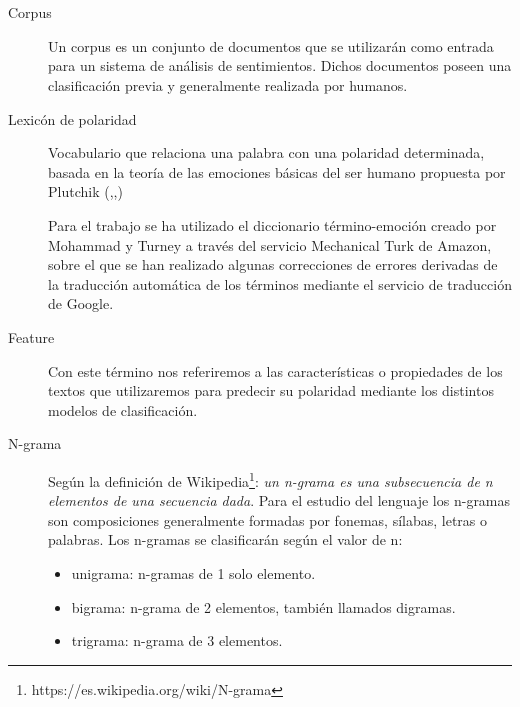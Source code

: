 \chapter*{\nomeglosariotermos}
\label{chap:glosario-termos}


\begin{description}
  
  \item [Corpus]
  Un corpus es un conjunto de documentos que se utilizarán como entrada para un sistema de análisis de sentimientos. Dichos documentos poseen una clasificación previa y generalmente realizada por humanos.
  
  \item[Lexicón de polaridad]
  
  Vocabulario que relaciona una palabra con una polaridad determinada, basada en la teoría de las emociones básicas del ser humano propuesta por Plutchik (\cite{Plutchick62},\cite{Plutchick80},\cite{Plutchick85})
  
  Para el trabajo se ha utilizado el diccionario término-emoción creado por Mohammad y Turney \cite{Lexicon} a través del servicio Mechanical Turk de Amazon, sobre el que se han realizado algunas correcciones de errores derivadas de la traducción automática de los términos mediante el servicio de traducción de Google.
  
  \item[Feature]
  
  Con este término nos referiremos a las características o propiedades de los textos que utilizaremos para predecir su polaridad mediante los distintos modelos de clasificación.
  
  \item[N-grama]
  
  Según la definición de Wikipedia\footnote{https://es.wikipedia.org/wiki/N-grama}: \textit{un n-grama es una subsecuencia de n elementos de una secuencia dada}. 
  Para el estudio del lenguaje los n-gramas son composiciones generalmente formadas por fonemas, sílabas, letras o palabras. 
  Los n-gramas se clasificarán según el valor de n:
  \begin{itemize}
  	\item unigrama: n-gramas de 1 solo elemento.
  	\item bigrama: n-grama de 2 elementos, también llamados digramas.
  	\item trigrama: n-grama de 3 elementos.
  \end{itemize}
  

\end{description}
